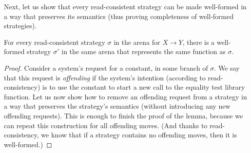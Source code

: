 Next, let us show that every read-consistent strategy can be made well-formed in a way that preserves its semantics
(thus proving completeness of well-formed strategies). 
\begin{lemma}\label{lem:all-well-formed}
    For every read-consistent strategy $\sigma$ in the arena for $X \to Y$,
    there is a well-formed strategy $\sigma'$ in the same arena that represents the same function as $\sigma$.
\end{lemma}
\begin{proof}
    Consider a system's request for a constant, in some branch  of $\sigma$. 
    We say that this request is \emph{offending} if the system's intention (according to read-consistency) is to use
    the constant to start a new call to the equality test library function.
    Let us now show how to remove an offending request from a strategy in a way that preserves the strategy's semantics
    (without introducing any new offending requests). This is enough to finish the proof of the lemma,
    because we can repeat this construction for all offending moves. (And thanks to read-consistency, we know that 
    if a strategy contains no offending moves, then it is well-formed.)


\end{proof}
